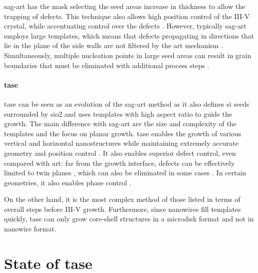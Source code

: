 \acs{sag}-\acs{art} has the mask selecting the seed areas increase in thickness to allow the trapping of defects. This technique also allows high position control of the III-V crystal, while accentuating control over the defects \cite{Han2016}. However, typically \acs{sag}-\acs{art} employs large templates, which means that defects propagating in directions that lie in the plane of the side walls are not filtered by the \acs{art} mechanism \cite{Kunert2018}. Simultaneously, multiple nucleation points in large seed areas can result in grain boundaries that must be eliminated with additional process steps \cite{Kunert2016}.
\par
\paragraph{\Acf{tase}} \acs{tase} can be seen as an evolution of the \acs{sag}-\acs{art} method as it also defines \acl{si} seeds surrounded by \acs{sio2} and uses templates with high aspect ratio to guide the growth. The main difference with \acs{sag}-\acs{art} are the size and complexity of the templates and the focus on planar growth. \acs{tase} enables the growth of various vertical and horizontal nanostructures while maintaining extremely accurate geometry and position control \cite{Ritter2021, Tiwari2020, Schmid2015}. It also enables superior defect control, even compared with \acs{art}: far from the growth interface, defects can be effectively limited to twin planes \cite{Han2020}, which can also be eliminated in some cases \cite{Knoedler2017}. In certain geometries, it also enables phase control \cite{Staudinger2018}. 

On the other hand, it is the most complex method of those listed in terms of overall steps before III-V growth. Furthermore, since nanowires fill templates quickly, \acs{tase} can only grow core-shell structures in a microdisk format \cite{Tiwari2020} and not in nanowire format. 
\par

\section{\texorpdfstring{State of \acl{tase}}{State of template assisted selective epitaxy}}
















